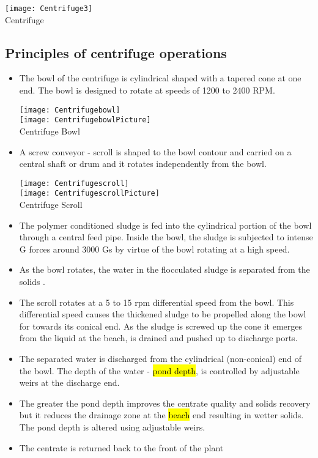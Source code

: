 			\begin{center}
				\texttt{[image: Centrifuge3]}\\
				Centrifuge
			\end{center}
\subsection{Principles of centrifuge operations}
				\begin{itemize}
					\item The bowl of the centrifuge is cylindrical shaped with a tapered cone at one end.  The bowl is designed to rotate at speeds of 1200 to 2400 RPM.
						\begin{center}
							\texttt{[image: Centrifugebowl]}\\
							\vspace{1cm}
							\texttt{[image: CentrifugebowlPicture]}\\
							Centrifuge Bowl
						\end{center}
					\item A screw conveyor - scroll is shaped to the bowl  contour and carried on a central shaft or drum and it rotates independently from the bowl.  
						\begin{center}
							\texttt{[image: Centrifugescroll]}\\
							\vspace{1cm}
							\texttt{[image: CentrifugescrollPicture]}\\
							Centrifuge Scroll
						\end{center}
					\item The polymer conditioned sludge is fed into the cylindrical portion of the bowl through a central feed pipe.  Inside the bowl, the sludge is subjected to intense G forces around 3000 Gs by virtue of the bowl rotating at a high speed. 
					\item As the bowl rotates, the water in the flocculated sludge is separated from the solids .  
					\item The scroll rotates at a 5 to 15 rpm differential speed from the bowl.  This differential speed causes the thickened  sludge to be propelled  along the bowl for towards its conical end.  As the sludge is screwed up the cone it emerges from the liquid at the beach, is drained and pushed up to discharge ports.  
					\item The separated water is discharged from the cylindrical (non-conical) end of the bowl.  The depth of the water - \hl{pond depth}, is controlled by adjustable weirs at the discharge end.
					\item The greater the pond depth improves the centrate quality and solids recovery but it reduces the drainage zone at the \hl{beach} end resulting in wetter solids.  The pond depth is altered using adjustable weirs.
					\item The centrate is returned back to the front of the plant 
				\end{itemize}
	
